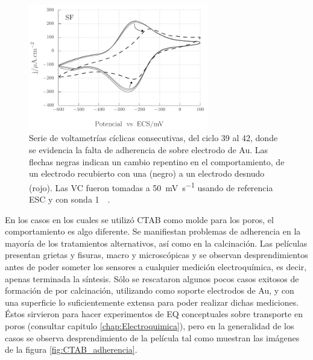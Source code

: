 				\begin{figure}[th]
				 	   	    \begin{center} 
				        	\includegraphics[width=0.70\textwidth]{Graficos/Adherencia_F127.pdf}
				       		\caption[Adherencia de \pdmF \space sobre una película delgada de Au.]{Serie de voltametrías cíclicas consecutivas, del ciclo 39 al 42, donde se evidencia la falta de adherencia de \pdmF\space sobre electrodo de Au. Las flechas negras indican un cambio repentino en el comportamiento, de un electrodo recubierto con una \pdm\space (negro) a un electrodo desnudo (rojo). Las VC fueron tomadas a \SI{50}{\milli\volt.\second^{-1}} usando de referencia ESC y con sonda \ru\space \SI{1}{\milli\Molar}.}
				         	\label{fig:adherencia_F127}
				     		\end{center}
				     		\end{figure}

			En los casos en los cuales se utilizó CTAB como molde para los poros, el comportamiento es algo diferente. Se manifiestan problemas de adherencia en la mayoría de los tratamientos alternativos, así como en la calcinación. Las películas presentan grietas y fisuras, macro y microscópicas y se observan desprendimientos antes de poder someter los sensores a cualquier medición electroquímica, es decir, apenas terminada la síntesis. Sólo se rescataron algunos pocos casos exitosos de formación de \pdmC\space por calcinación, utilizando como soporte electrodos de Au, y con una superficie lo suficientemente extensa para poder realizar dichas mediciones. Éstos sirvieron para hacer experimentos de EQ conceptuales sobre transporte en poros (consultar capitulo \ref{chap:Electroquimica}), pero en la generalidad de los casos se observa desprendimiento de la película tal como muestran las imágenes de la figura \ref{fig:CTAB_adherencia}.


